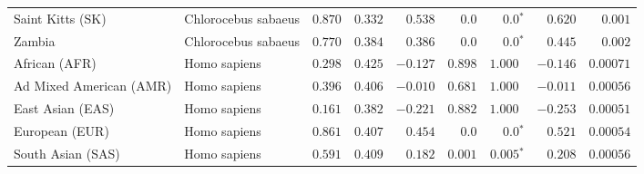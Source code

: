 \begin{center}
\begin{adjustbox}{width = 1\textwidth}
\begin{tabular}{|l|l|r|r|r|r|r|r|r|}
            Saint Kitts (SK)                  & Chlorocebus sabaeus        & $ 0.870$ & $ 0.332$ & $ 0.538$ & $0.0$ & $\bm{0.0{^*}}$        & $ 0.620$ & $ 0.001$ \\
            Zambia        & Chlorocebus sabaeus        & $ 0.770$ & $ 0.384$ & $ 0.386$ & $0.0$ & $\bm{0.0{^*}}$ & $ 0.445$ & $ 0.002$ \\
            African (AFR)               & Homo sapiens        & $ 0.298$ & $ 0.425$ & $-0.127$ & $ 0.898$ & $ 1.000~~$        & $-0.146$ & $0.00071$ \\
            Ad Mixed American (AMR)                 & Homo sapiens        & $ 0.396$ & $ 0.406$ & $-0.010$ & $ 0.681$    & $ 1.000~~$    & $-0.011$ & $0.00056$ \\
            East Asian (EAS)              & Homo sapiens        & $ 0.161$ & $ 0.382$ & $-0.221$ & $ 0.882$ & $ 1.000~~$ & $-0.253$ & $0.00051$ \\
            European (EUR)              & Homo sapiens        & $ 0.861$ & $ 0.407$ & $ 0.454$ & $0.0$ & $\bm{0.0{^*}}$ & $ 0.521$ & $0.00054$ \\
            South Asian (SAS)              & Homo sapiens        & $ 0.591$ & $ 0.409$ & $ 0.182$ & $ 0.001$ & $\bm{ 0.005{^*}}$ & $ 0.208$ & $0.00056$ \\
            \bottomrule
        \end{tabular}
    \end{adjustbox}
\end{center}